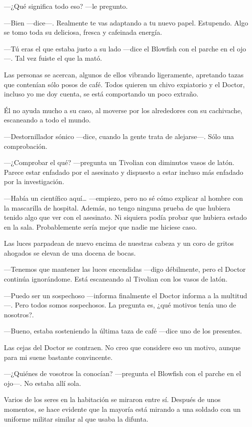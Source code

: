 ---¿Qué significa todo eso? ---le pregunto.

---Bien ---dice---. Realmente te vas adaptando a tu nuevo
papel. Estupendo. Algo se tomo toda su deliciosa, fresca y cafeinada
energía.

---Tú eras el que estaba justo a su lado ---dice el Blowfish con el
parche en el ojo---. Tal vez fuiste el que la mató.

Las personas se acercan, algunos de ellos vibrando ligeramente,
apretando tazas que contenían sólo posos de café. Todos quieren un chivo
expiatorio y el Doctor, incluso yo me doy cuenta, se está comportando un
poco extraño.

Él no ayuda mucho a su caso, al moverse por los alrededores con su
cachivache, escaneando a todo el mundo. 

---Destornillador sónico ---dice, cuando la gente trata de
alejarse---. Sólo una comprobación.

---¿Comprobar el qué? ---pregunta un Tivolian con diminutos vasos de
latón. Parece estar enfadado por el asesinato y dispuesto a estar
incluso más enfadado por la investigación.

---Había un científico aquí\ldots{} ---empiezo, pero no sé cómo explicar
al hombre con la mascarilla de hospital. Además, no tengo ninguna prueba
de que hubiera tenido algo que ver con el asesinato. Ni siquiera podía
probar que hubiera estado en la sala. Probablemente sería mejor que
nadie me hiciese caso.

Las luces parpadean de nuevo encima de nuestras cabeza y un coro de
gritos ahogados se elevan de una docena de bocas.

---Tenemos que mantener las luces encendidas ---digo débilmente, pero el
Doctor continúa ignorándome. Está escaneando al Tivolian con los vasos
de latón.

---Puedo ser un sospechoso ---informa finalmente el Doctor informa a la
multitud---. Pero todos somos sospechosos. La pregunta es, ¿qué motivos
tenía uno de nosotros?.

---Bueno, estaba sosteniendo la última taza de café ---dice uno de los
presentes.

Las cejas del Doctor se contraen. No creo que considere eso un motivo,
aunque para mi suene bastante convincente.

---¿Quiénes de vosotros la conocían? ---pregunta el Blowfish con el
parche en el ojo---. No estaba allí sola.

Varios de los seres en la habitación se miraron entre sí. Después de
unos momentos, se hace evidente que la mayoría está mirando a una
soldado con un uniforme militar similar al que usaba la difunta.

